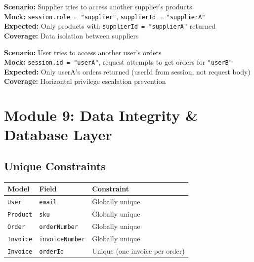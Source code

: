 \documentclass[12pt,a4paper]{report}
\newcommand{\pone}{\textbf{\color{p1red}P1}}
\begin{document}
\begin{tcolorbox}[criticalbox, title={RBAC-010 \hfill \pone\ --- Data Isolation}]
\textbf{Scenario:} Supplier tries to access another supplier's products \\
\textbf{Mock:} \texttt{session.role = "supplier"}, \texttt{supplierId = "supplierA"} \\
\textbf{Expected:} Only products with \texttt{supplierId = "supplierA"} returned \\
\textbf{Coverage:} Data isolation between suppliers
\end{tcolorbox}

\begin{tcolorbox}[criticalbox, title={RBAC-011 \hfill \pone\ --- Horizontal Privilege Escalation}]
\textbf{Scenario:} User tries to access another user's orders \\
\textbf{Mock:} \texttt{session.id = "userA"}, request attempts to get orders for \texttt{"userB"} \\
\textbf{Expected:} Only userA's orders returned (userId from session, not request body) \\
\textbf{Coverage:} Horizontal privilege escalation prevention
\end{tcolorbox}

\chapter{Module 9: Data Integrity \& Database Layer}

\section{Unique Constraints}

\begin{center}
\begin{tabular}{lll}
  \toprule
  \textbf{Model} & \textbf{Field} & \textbf{Constraint} \\
  \midrule
  \texttt{User}    & \texttt{email}         & Globally unique \\
  \texttt{Product} & \texttt{sku}           & Globally unique \\
  \texttt{Order}   & \texttt{orderNumber}   & Globally unique \\
  \texttt{Invoice} & \texttt{invoiceNumber} & Globally unique \\
  \texttt{Invoice} & \texttt{orderId}       & Unique (one invoice per order) \\
  \bottomrule
\end{tabular}
\end{center}
\end{document}

